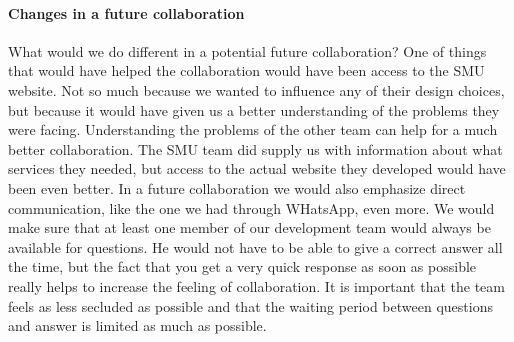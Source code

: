 \documentclass[a4paper,11pt,report]{article}
\begin{document}
{\paragraph{Changes in a future collaboration}
What would we do different in a potential future collaboration? One of things that would have helped the collaboration would have been access to the SMU website. Not so much because we wanted to influence any of their design choices, but because it would have given us a better understanding of the problems they were facing. Understanding the problems of the other team can help for a much better collaboration. The SMU team did supply us with information about what services they needed, but access to the actual website they developed would have been even better. In a future collaboration we would also emphasize direct communication, like the one we had through WHatsApp, even more. We would make sure that at least one member of our development team would always be available for questions. He would not have to be able to give a correct answer all the time, but the fact that you get a very quick response as soon as possible really helps to increase the feeling of collaboration. It is important that the team feels as less secluded as possible and that the waiting period between questions and answer is limited as much as possible. 

}
\end{document}
